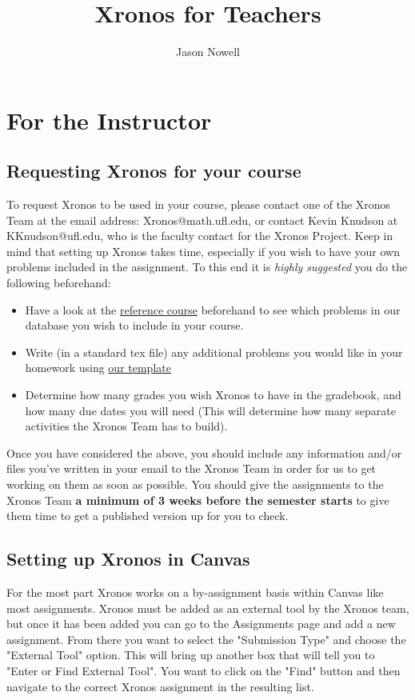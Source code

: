 \documentclass{article}
\title{Xronos for Teachers}
\author{Jason Nowell}
\begin{document}
\maketitle
\tableofcontents


\newpage
\section{For the Instructor}
\subsection{Requesting Xronos for your course}
To request Xronos to be used in your course, please contact one of the Xronos Team at the email address: Xronos@math.ufl.edu, or contact Kevin Knudson at KKnudson@ufl.edu, who is the faculty contact for the Xronos Project. Keep in mind that setting up Xronos takes time, especially if you wish to have your own problems included in the assignment. To this end it is \textit{highly suggested} you do the following beforehand:
\begin{itemize}
\item Have a look at the \href{https://xronos.clas.ufl.edu/refcoursenew/Reference}{reference course} beforehand to see which problems in our database you wish to include in your course.
\item Write (in a standard tex file) any additional problems you would like in your homework using \href{TBD}{our template}
\item Determine how many grades you wish Xronos to have in the gradebook, and how many due dates you will need (This will determine how many separate activities the Xronos Team has to build).
\end{itemize}

Once you have considered the above, you should include any information and/or files you've written in your email to the Xronos Team in order for us to get working on them as soon as possible. You should give the assignments to the Xronos Team \textbf{a minimum of 3 weeks before the semester starts} to give them time to get a published version up for you to check.

\subsection{Setting up Xronos in Canvas}
For the most part Xronos works on a by-assignment basis within Canvas like most assignments. Xronos must be added as an external tool by the Xronos team, but once it has been added you can go to the Assignments page and add a new assignment. From there you want to select the "Submission Type" and choose the "External Tool" option. This will bring up another box that will tell you to "Enter or Find External Tool". You want to click on the "Find" button and then navigate to the correct Xronos assignment in the resulting list.
\end{document}
